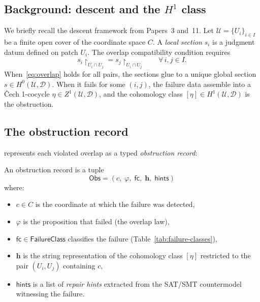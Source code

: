 \documentclass[11pt]{article}
\newcommand{\hone}{H^1}                     %
\newcommand{\hzero}{H^0}                    %
\begin{document}
\subsection{Background: descent and the \texorpdfstring{$\hone$}{H1} class}

We briefly recall the descent framework from Papers~3 and~11.  Let
$\mathcal{U} = \{U_i\}_{i \in I}$ be a finite open cover of the coordinate
space $C$.  A \emph{local section} $s_i$ is a judgment datum defined on
patch $U_i$.  The overlap compatibility condition requires
\begin{equation}
  s_i\!\restriction_{U_i \cap U_j} = s_j\!\restriction_{U_i \cap U_j}
  \qquad \forall\, i, j \in I.
  \label{eq:overlap}
\end{equation}
When~\eqref{eq:overlap} holds for all pairs, the sections glue to a unique
global section $s \in \hzero(\mathcal{U}, \mathcal{D})$.  When it fails for
some $(i,j)$, the failure data assemble into a Čech 1-cocycle
$\eta \in Z^1(\mathcal{U}, \mathcal{D})$, and the cohomology class
$[\eta] \in \hone(\mathcal{U}, \mathcal{D})$ is the obstruction.

\subsection{The obstruction record}
\label{subsec:obstruction-record}

\JuGeo{} represents each violated overlap as a typed \emph{obstruction
record}:

\begin{definition}
\label{def:obstruction-record}
An obstruction record is a tuple
\[
  \mathsf{Obs} = (c,\;\varphi,\;\mathsf{fc},\;\mathbf{h},\;\mathsf{hints})
\]
where:
\begin{itemize}[itemsep=2pt]
  \item $c \in C$ is the coordinate at which the failure was detected,
  \item $\varphi$ is the proposition that failed (the overlap law),
  \item $\mathsf{fc} \in \mathsf{FailureClass}$ classifies the failure
        (Table~\ref{tab:failure-classes}),
  \item $\mathbf{h}$ is the string representation of the cohomology class
        $[\eta]$ restricted to the pair $(U_i, U_j)$ containing $c$,
  \item $\mathsf{hints}$ is a list of \emph{repair hints} extracted from
        the SAT/SMT countermodel witnessing the failure.
\end{itemize}
\end{definition}
\end{document}
